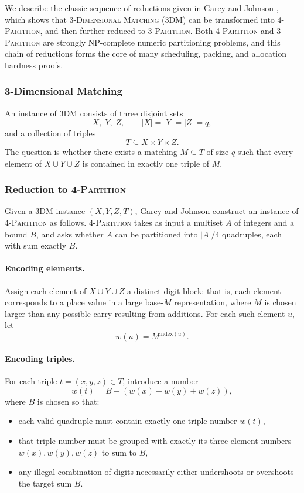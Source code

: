 \documentclass[9pt]{extarticle}
\begin{document}
We describe the classic sequence of reductions given in Garey and Johnson
\cite{garey-johnson}, which shows that \textsc{3-Dimensional Matching} (3DM)
can be transformed into \textsc{4-Partition}, and then further reduced to
\textsc{3-Partition}.  
Both \textsc{4-Partition} and \textsc{3-Partition} are strongly NP-complete
numeric partitioning problems, and this chain of reductions forms the core of
many scheduling, packing, and allocation hardness proofs.

\subsubsection*{3-Dimensional Matching}

An instance of \textsc{3DM} consists of three disjoint sets
\[
X,\; Y,\; Z,\qquad |X| = |Y| = |Z| = q,
\]
and a collection of triples
\[
T \subseteq X \times Y \times Z.
\]
The question is whether there exists a matching 
$M \subseteq T$ of size $q$ such that every element of $X \cup Y \cup Z$ is
contained in exactly one triple of $M$.

\subsubsection*{Reduction to \textsc{4-Partition}}

Given a 3DM instance $(X,Y,Z,T)$, Garey and Johnson construct an instance of
\textsc{4-Partition} as follows.  
\textsc{4-Partition} takes as input a multiset $A$ of integers and a bound $B$,
and asks whether $A$ can be partitioned into $|A|/4$ quadruples, each with sum
exactly $B$.

\paragraph{Encoding elements.}
Assign each element of $X \cup Y \cup Z$ a distinct digit block: that is,
each element corresponds to a place value in a large base-$M$ representation,
where $M$ is chosen larger than any possible carry resulting from additions.
For each such element $u$, let
\[
w(u) = M^{\mathrm{index}(u)}.
\]

\paragraph{Encoding triples.}
For each triple $t=(x,y,z)\in T$, introduce a number
\[
w(t) = B - (w(x)+w(y)+w(z)),
\]
where $B$ is chosen so that:
\begin{itemize}
    \item each valid quadruple must contain exactly one triple-number $w(t)$,
    \item that triple-number must be grouped with exactly its three element-numbers
          $w(x), w(y), w(z)$ to sum to $B$,
    \item any illegal combination of digits necessarily either undershoots or
          overshoots the target sum $B$.
\end{itemize}
\end{document}
